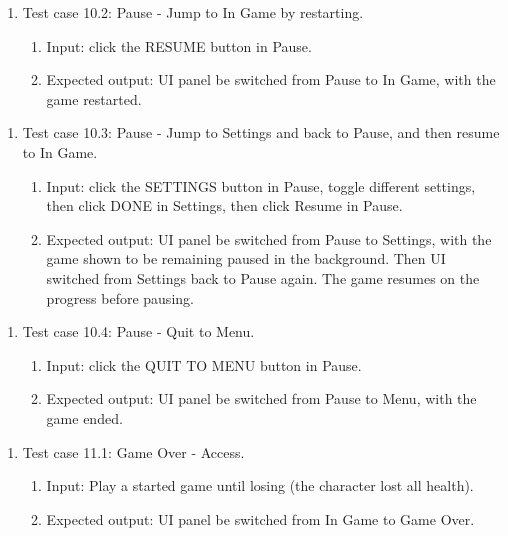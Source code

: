 \documentclass[11pt]{article}
\begin{document}
    \begin{enumerate}
        \item Test case 10.2: Pause - Jump to In Game by restarting.
        \begin{enumerate}
            \item  Input: click the RESUME button in Pause.
            \item  Expected output: UI panel be switched from Pause to In Game, with the game restarted.
        \end{enumerate}
    \end{enumerate}
    \begin{enumerate}
        \item Test case 10.3: Pause - Jump to Settings and back to Pause, and then resume to In Game.
        \begin{enumerate}
            \item  Input: click the SETTINGS button in Pause, toggle different settings, then click DONE in Settings, then click Resume in Pause.
            \item  Expected output: UI panel be switched from Pause to Settings, with the game shown to be remaining paused in the background. Then UI switched from Settings back to Pause again. The game resumes on the progress before pausing.
        \end{enumerate}
    \end{enumerate}
    \begin{enumerate}
        \item Test case 10.4: Pause - Quit to Menu.
        \begin{enumerate}
            \item  Input: click the QUIT TO MENU button in Pause.
            \item  Expected output: UI panel be switched from Pause to Menu, with the game ended.
        \end{enumerate}
    \end{enumerate}
    \begin{enumerate}
        \item Test case 11.1: Game Over - Access.
        \begin{enumerate}
            \item  Input: Play a started game until losing (the character lost all health).
            \item  Expected output: UI panel be switched from In Game to Game Over.
        \end{enumerate}
    \end{enumerate}
\end{document}
